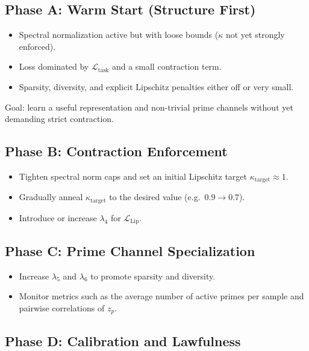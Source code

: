\documentclass[11pt]{article}
\begin{document}
\subsection{Phase A: Warm Start (Structure First)}

\begin{itemize}[leftmargin=*]
  \item Spectral normalization active but with loose bounds (\(\kappa\) not yet strongly enforced).
  \item Loss dominated by \(\mathcal{L}_{\text{task}}\) and a small contraction term.
  \item Sparsity, diversity, and explicit Lipschitz penalties either off or very small.
\end{itemize}
Goal: learn a useful representation and non-trivial prime channels without yet demanding strict contraction.

\subsection{Phase B: Contraction Enforcement}

\begin{itemize}[leftmargin=*]
  \item Tighten spectral norm caps and set an initial Lipschitz target \(\kappa_{\text{target}} \approx 1\).
  \item Gradually anneal \(\kappa_{\text{target}}\) to the desired value (e.g.\ \(0.9 \to 0.7\)).
  \item Introduce or increase \(\lambda_4\) for \(\mathcal{L}_{\mathrm{Lip}}\).
\end{itemize}

\subsection{Phase C: Prime Channel Specialization}

\begin{itemize}[leftmargin=*]
  \item Increase \(\lambda_5\) and \(\lambda_6\) to promote sparsity and diversity.
  \item Monitor metrics such as the average number of active primes per sample and pairwise correlations of \(z_p\).
\end{itemize}

\subsection{Phase D: Calibration and Lawfulness}
\end{document}
